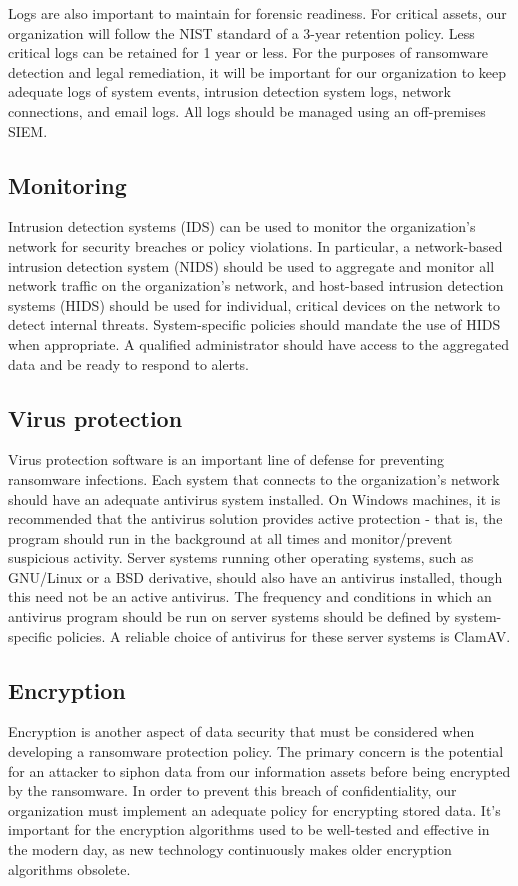 \documentclass[11pt]{article}
\begin{document}
Logs are also important to maintain for forensic readiness. For critical assets, our organization will follow the NIST standard of a 3-year retention policy. Less critical logs can be retained for 1 year or less. For the purposes of ransomware detection and legal remediation, it will be important for our organization to keep adequate logs of system events, intrusion detection system logs, network connections, and email logs. All logs should be managed using an off-premises SIEM.

\subsection{Monitoring}
\label{sec:org34b8d0d}
Intrusion detection systems (IDS) can be used to monitor the organization's network for security breaches or policy violations. In particular, a network-based intrusion detection system (NIDS) should be used to aggregate and monitor all network traffic on the organization's network, and host-based intrusion detection systems (HIDS) should be used for individual, critical devices on the network to detect internal threats. System-specific policies should mandate the use of HIDS when appropriate. A qualified administrator should have access to the aggregated data and be ready to respond to alerts.

\subsection{Virus protection}
\label{sec:org3221e5c}
Virus protection software is an important line of defense for preventing ransomware infections. Each system that connects to the organization's network should have an adequate antivirus system installed. On Windows machines, it is recommended that the antivirus solution provides active protection - that is, the program should run in the background at all times and monitor/prevent suspicious activity. Server systems running other operating systems, such as GNU/Linux or a BSD derivative, should also have an antivirus installed, though this need not be an active antivirus. The frequency and conditions in which an antivirus program should be run on server systems should be defined by system-specific policies. A reliable choice of antivirus for these server systems is ClamAV.

\subsection{Encryption}
\label{sec:orgbdae00c}
Encryption is another aspect of data security that must be considered when developing a ransomware protection policy. The primary concern is the potential for an attacker to siphon data from our information assets before being encrypted by the ransomware. In order to prevent this breach of confidentiality, our organization must implement an adequate policy for encrypting stored data. It's important for the encryption algorithms used to be well-tested and effective in the modern day, as new technology continuously makes older encryption algorithms obsolete.
\end{document}
